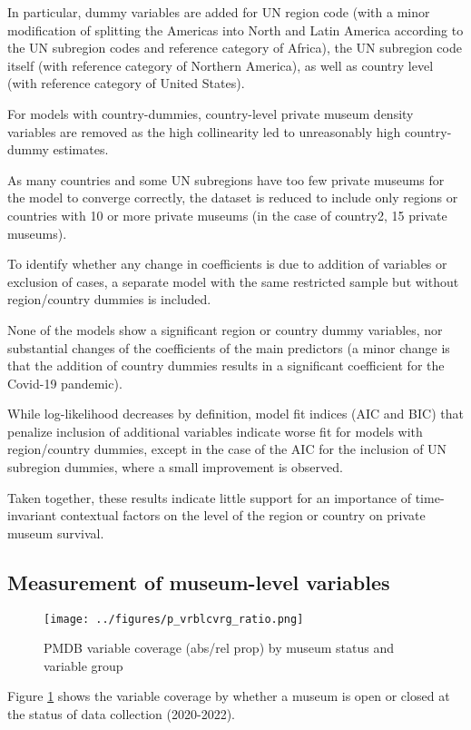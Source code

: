\documentclass[12pt]{article}
\begin{document}
In particular, dummy variables are added for UN region code (with a minor modification of splitting the Americas into North and Latin America according to the UN subregion codes and reference category of Africa), the UN subregion code itself (with reference category of Northern America), as well as country level (with reference category of United States).

For models with country-dummies, country-level private museum density variables are removed as the high collinearity led to unreasonably high country-dummy estimates.

As many countries and some UN subregions have too few private museums for the model to converge correctly, the dataset is reduced to include only regions or countries with 10 or more private museums (in the case of country2, 15 private museums).

To identify whether any change in coefficients is due to addition of variables or exclusion of cases, a separate model with the same restricted sample but without region/country dummies is included.


None of the models show a significant region or country dummy variables, nor substantial changes of the coefficients of the main predictors (a minor change is that the addition of country dummies results in a significant coefficient for the Covid-19 pandemic).

While log-likelihood decreases by definition, model fit indices (AIC and BIC) that penalize inclusion of additional variables indicate worse fit for models with region/country dummies, except in the case of the AIC for the inclusion of UN subregion dummies, where a small improvement is observed.

Taken together, these results indicate little support for an importance of time-invariant contextual factors on the level of the region or country on private museum survival. 
\subsection*{Measurement of museum-level variables}


\begin{figure}[htbp]
\centering
\texttt{[image: ../figures/p\_vrblcvrg\_ratio.png]}
\caption{\label{fig:p_vrblcvrg_ratio}PMDB variable coverage (abs/rel prop) by museum status and variable group}
\end{figure}

Figure \ref{fig:p_vrblcvrg_ratio} shows the variable coverage by whether a museum is open or closed at the status of data collection (2020-2022).
\end{document}
